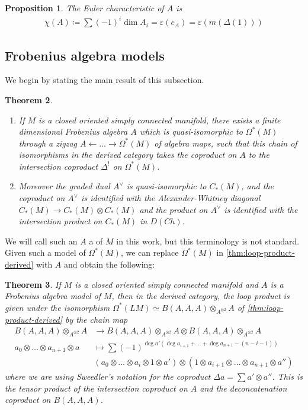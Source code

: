 \documentclass{scrartcl}
\let\emph\relax
\theoremstyle{plain}
\newtheorem{theorem}{Theorem}[section]
\newtheorem{proposition}[theorem]{Proposition}
\theoremstyle{definition}
\renewcommand{\epsilon}{\varepsilon}
\newcommand{\quiso}{\simeq}
\newcommand{\defeq}{\coloneqq}
\newcommand{\from}{\leftarrow}
\begin{document}
\begin{proposition}
    The Euler characteristic of $A$ is
    \begin{align*}
        \chi(A) \defeq \sum (-1)^i\dim A_i = \epsilon(e_A) = \epsilon(m(\Delta(1)))
    \end{align*}
\end{proposition}

\subsection{Frobenius algebra models}

We begin by stating the main result of this subsection. 
\begin{theorem}\label{thm:frobenius-model}
    \begin{enumerate}
    \item If $M$ is a closed oriented simply connected manifold, there exists a finite dimensional Frobenius algebra $A$ which is quasi-isomorphic to $\Omega^*(M)$ through a zigzag $A\from \dots\to \Omega^*(M)$ of algebra maps, such that this chain of isomorphisms in the derived category takes the coproduct on $A$ to the intersection coproduct $\Delta^!$ on $\Omega^*(M)$. 
    
    \item Moreover the graded dual $A^\vee$ is quasi-isomorphic to $C_*(M)$, and the coproduct on $A^\vee$ is identified with the Alexander-Whitney diagonal $C_*(M)\to C_*(M)\otimes C_*(M)$ and the product on $A^\vee$ is identified with the intersection product on $C_*(M)$ in $D(Ch)$.
    \end{enumerate}
\end{theorem}

We will call such an $A$ a \emph{Frobenius algebra model} of $M$ in this work, but this terminology is not standard. Given such a model of $\Omega^*(M)$, we can replace $\Omega^*(M)$ in \cref{thm:loop-product-derived} with $A$ and obtain the following:

\begin{theorem}
    If $M$ is a closed oriented simply connected manifold and $A$ is a Frobenius algebra model of $M$, then in the derived category, the loop product is given under the isomorphism $\Omega^*(LM)\quiso B(A, A, A)\otimes_{A^{\otimes 2}} A$ of \cref{thm:loop-product-derived} by the chain map
    \begin{align*}
        B(A, A, A)\otimes_{A^{\otimes 2}} A &\to B(A, A, A)\otimes_{A^{\otimes 2}} A \otimes B(A, A, A)\otimes_{A^{\otimes 2}} A \\
        a_0\otimes\dots \otimes a_{n+1}\otimes a &\mapsto \sum(-1)^{\deg a'(\deg a_{i+1}+\dots+\deg a_{n+1} - (n-i-1))}\\
        \qquad& (a_0 \otimes\dots\otimes a_i \otimes 1 \otimes a')\otimes (1\otimes a_{i+1}\otimes\dots\otimes a_{n+1}\otimes a'')
    \end{align*}
    where we are using Sweedler's notation for the coproduct $\Delta a = \sum a'\otimes a''$. This is the tensor product of the intersection coproduct on $A$ and the deconcatenation coproduct on $B(A, A, A)$.
\end{theorem}
\end{document}
